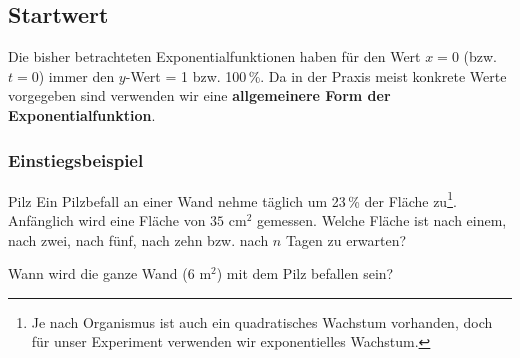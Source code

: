 


%
\newpage


\subsection{Startwert}

Die bisher betrachteten Exponentialfunktionen haben für den Wert $x=0$ (bzw. $t=0$) immer den
$y$-Wert = 1 bzw. 100\,\%.
Da in der Praxis meist konkrete Werte vorgegeben sind verwenden wir
eine \textbf{allgemeinere Form der Exponentialfunktion}.

\subsubsection{Einstiegsbeispiel}

\begin{beispiel}{Pilz}{}
  Ein Pilzbefall an einer Wand nehme täglich um 23\,\% der Fläche
  zu\footnote{Je nach Organismus ist auch ein quadratisches Wachstum
  vorhanden, doch für unser Experiment verwenden wir exponentielles Wachstum.}.
  Anfänglich wird eine Fläche von $35$ $\text{cm}^2$ gemessen.
  Welche Fläche ist nach einem, nach zwei, nach fünf, nach zehn
  bzw. nach $n$ 
  Tagen zu erwarten?


  Wann wird die ganze Wand ($6 \text{ m}^2$) mit dem Pilz befallen
  sein?
  

\end{beispiel}


